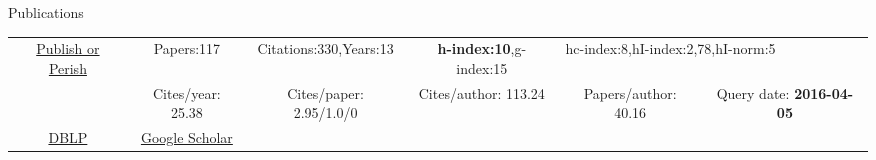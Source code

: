 \begin{rubrique}{Publications}

  {\footnotesize


    \begin{tabular}{|c||ccccc|}
      \hline
      \multirow{2}{4em}{\href{http://www.harzing.com/pop.htm}{Publish or Perish}}
      & Papers:117        & Citations:330,Years:13   & \textbf{h-index:10},g-index:15 & \multicolumn{2}{l|}{hc-index:8,hI-index:2,78,hI-norm:5}\\
      & Cites/year: 25.38 & Cites/paper: 2.95/1.0/0  & Cites/author: 113.24 & Papers/author: 40.16 & Query date: \textbf{2016-04-05}\\
      \hline
      \href{http://www.informatik.uni-trier.de/~ley/pers/hd/v/Varrette:S=eacute=bastien.html}{DBLP} &
                                                                                                      \multicolumn{1}{c|}{\href{https://scholar.google.fr/citations?hl=fr\&user=6PTStIcAAAAJ\&view_op=list_works\&sortby=pubdate}{Google Scholar}}\\
      \cline{1-2}
    \end{tabular}
  }
  ~\\[2em]




\end{rubrique}





%
